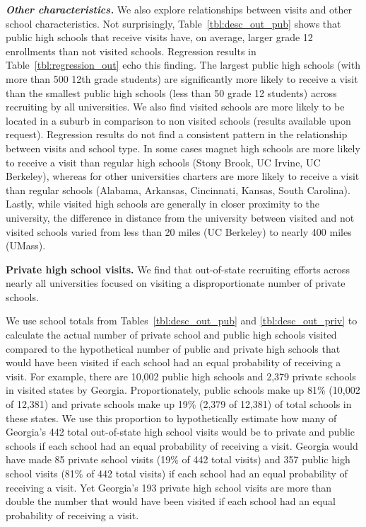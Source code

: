 \documentclass[twoside]{article}
\begin{document}
\textbf{\textit{Other characteristics.}} We also explore relationships between visits and other school characteristics. Not surprisingly, Table~\ref{tbl:desc_out_pub} shows that public high schools that receive visits have, on average, larger grade 12 enrollments than not visited schools. Regression results in Table~\ref{tbl:regression_out} echo this finding. The largest public high schools (with more than 500 12th grade students) are significantly more likely to receive a visit than the smallest public high schools (less than 50 grade 12 students) across recruiting by all universities.  We also find visited schools are more likely to be located in a suburb in comparison to non visited schools (results available upon request). Regression results do not find a consistent pattern in the relationship between visits and school type. In some cases magnet high schools are more likely to receive a visit than regular high schools (Stony Brook, UC Irvine, UC Berkeley), whereas for other universities charters are more likely to receive a visit than regular schools (Alabama, Arkansas, Cincinnati, Kansas, South Carolina). Lastly, while visited high schools are generally in closer proximity to the university, the difference in distance from the university between visited and not visited schools varied from less than 20 miles (UC Berkeley) to nearly 400 miles (UMass).


\textbf{Private high school visits.} We find that out-of-state recruiting efforts across nearly all universities focused on visiting a disproportionate number of private schools. 

We use school totals from Tables~\ref{tbl:desc_out_pub} and \ref{tbl:desc_out_priv} to calculate the actual number of private school and public high schools visited compared to the hypothetical number of public and private high schools that would have been visited if each school had an equal probability of receiving a visit. For example, there are 10,002 public high schools and 2,379 private schools in visited states by Georgia. Proportionately, public schools  make up 81\% (10,002 of 12,381) and private schools make up 19\% (2,379 of 12,381) of total schools in these states. We use this proportion to hypothetically estimate how many of Georgia's 442 total out-of-state high school visits would be to private and public schools if each school had an equal probability of receiving a visit. Georgia would have made 85 private school visits (19\% of 442 total visits) and 357 public high school visits (81\% of 442 total visits) if each school had an equal probability of receiving a visit. Yet Georgia's 193 private high school visits are more than double the number that would have been visited if each school had an equal probability of receiving a visit.
\end{document}
